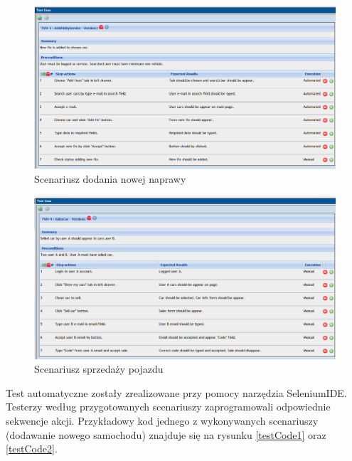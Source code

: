 \documentclass[12pt]{article}
\begin{document}
	
	 \begin{figure}[H]
		\centering
		\includegraphics[scale=0.61]{addFixByServiceTest.png}
		\caption{Scenariusz dodania nowej naprawy}
		\label{test3}
	\end{figure}
	
	
	 \begin{figure}[H]
		\centering
		\includegraphics[scale=0.61]{saleTestCar.png}
		\caption{Scenariusz sprzedaży pojazdu}
		\label{test4}
	\end{figure}

Test automatyczne zostały zrealizowane przy pomocy narzędzia SeleniumIDE. Testerzy według przygotowanych scenariuszy zaprogramowali odpowiednie sekwencje akcji. Przykładowy kod jednego z wykonywanych scenariuszy (dodawanie nowego samochodu) znajduje się na rysunku \ref{testCode1} oraz \ref{testCode2}.
\end{document}
